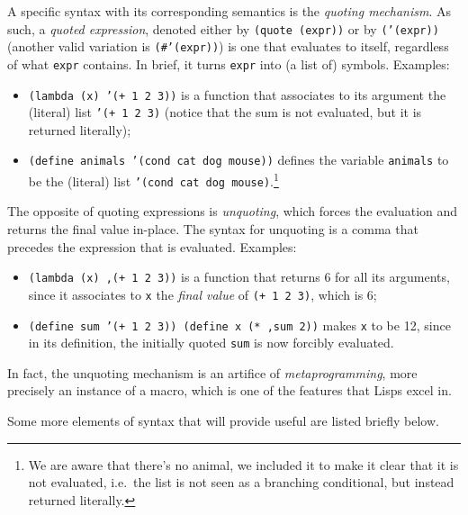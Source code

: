 A specific syntax with its corresponding semantics is the \emph{quoting mechanism}.
As such, a \emph{quoted expression}, denoted either by \texttt{(quote (expr))} or
by \texttt{('(expr))} (another valid variation is \texttt{(\#'(expr))}) is one that
evaluates to itself, regardless of what \texttt{expr} contains. In brief, it turns
\texttt{expr} into (a list of) symbols. Examples:
\begin{itemize}
\item \texttt{(lambda (x) '(+ 1 2 3))} is a function that associates to its argument
  the (literal) list \texttt{'(+ 1 2 3)} (notice that the sum is not evaluated, but
  it is returned literally);
\item \texttt{(define animals '(cond cat dog mouse))} defines the variable \texttt{animals}
  to be the (literal) list \texttt{'(cond cat dog mouse)}.\footnote{We are aware that
    there's no  animal, we included it to make it clear that it is not
    evaluated, i.e.\ the list is not seen as a branching conditional, but instead
    returned literally.}
\end{itemize}

The opposite of quoting expressions is \emph{unquoting}, which forces the
evaluation and returns the final value in-place. The syntax for unquoting is
a comma that precedes the expression that is evaluated. Examples:
\begin{itemize}
\item \texttt{(lambda (x) ,(+ 1 2 3))} is a function that returns 6 for all its
  arguments, since it associates to \texttt{x} the \emph{final value} of
  \texttt{(+ 1 2 3)}, which is 6;
\item \texttt{(define sum '(+ 1 2 3)) (define x (* ,sum 2))} makes \texttt{x} to
  be 12, since in its definition, the initially quoted \texttt{sum} is now
  forcibly evaluated.
\end{itemize}

In fact, the unquoting mechanism is an artifice of \emph{metaprogramming}, more
precisely an instance of a macro, which is one of the features that Lisps excel in.

Some more elements of syntax that will provide useful are listed briefly below.

